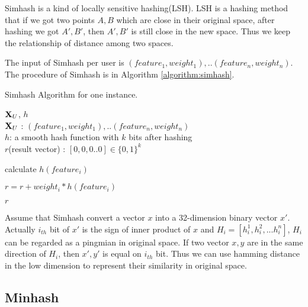 Simhash is a kind of locally sensitive hashing(LSH). LSH is a hashing method that if we got two points $A,B$ which are close in their original space, after hashing we got $A',B'$, then $A',B'$ is still close in the new space. Thus we keep the relationship of distance among two spaces. 

The input of Simhash per user is $(feature_1, weight_1),..(feature_n,weight_n)$. The procedure of Simhash is in Algorithm \ref{algorithm:simhash}.

\begin{algorithm}[tb]
\caption{Simhash Algorithm for one instance.}
\begin{algorithmic}

 $\mathbf{X}_U$, $h$\\
$\mathbf{X}_{U}$ : $(feature_1, weight_1),..(feature_n,weight_n)$ \\
$h$: a smooth hash function with $k$ bits after hashing\\

 $r$(result vector) : $[0,0,0..0] \in \{0,1\}^k$


\STATE calculate $h(feature_i)$

\STATE $r = r + weight_i * h(feature_i)$

\ENDFOR


\ENDFOR

 $r$

\end{algorithmic}
\label{algorithm:simhash}
\end{algorithm}

Assume that Simhash convert a vector $x$ into a 32-dimension binary vector $x'$. Actually $i_{th}$ bit of $x'$ is the sign of inner product of $x$ and $H_i = [h^1_i, h^2_i,...h^n_i]$, $H_i$ can be regarded as a pingmian in original space. If two vector $x, y$ are in the same direction of $H_i$, then $x', y'$ is equal on $i_{th}$ bit. Thus we can use hamming distance in the low dimension to represent their similarity in original space.

\subsection{Minhash}

